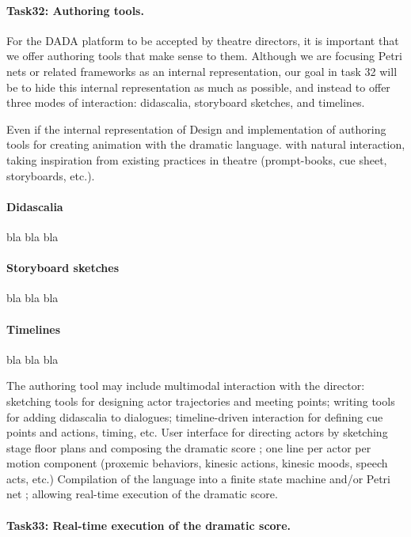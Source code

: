 \paragraph{Task32: Authoring tools.}

For the DADA platform to be accepted by theatre directors, it is important that we offer authoring tools that make sense to them. 
Although we are focusing Petri nets or related frameworks as an internal representation, our goal in task 32 will be to hide this internal representation as much as possible, and instead to offer three modes of interaction: didascalia, storyboard sketches, and timelines.

Even if the internal representation of Design and implementation of authoring tools for creating animation with the dramatic language.
with natural interaction, taking inspiration from existing practices in theatre (prompt-books, cue sheet, storyboards, etc.).

\paragraph{Didascalia} bla bla bla

\paragraph{Storyboard sketches} bla bla bla

\paragraph{Timelines} bla bla bla

The authoring tool may include multimodal interaction with the director: sketching tools for designing actor trajectories
and meeting points; writing tools for adding didascalia to dialogues; timeline-driven interaction for defining cue points
and actions, timing, etc. User interface for directing actors by sketching stage floor plans and composing the dramatic score ; one line per actor per motion component (proxemic behaviors, kinesic actions, kinesic moods, speech acts, etc.) Compilation of the language into a finite state machine and/or Petri net ; allowing real-time execution of the dramatic score.


\paragraph{Task33: Real-time execution of the dramatic score.} 

